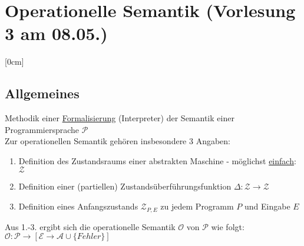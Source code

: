 \section{Operationelle Semantik \tiny (Vorlesung 3 am 08.05.)}
[0cm]
\subsection{Allgemeines}
Methodik einer \underline{Formalisierung} (Interpreter) der Semantik einer Programmiersprache $\mathcal{P}$\\
Zur operationellen Semantik gehören insbesondere 3 Angaben:
\begin{enumerate}
	\item Definition des Zustandsraums einer abstrakten Maschine - möglichst \underline{einfach}: $\mathcal{Z}$
	\item Definition einer (partiellen) Zustandsüberführungsfunktion $\Delta:\mathcal{Z}\rightarrow \mathcal{Z}$
	\item Definition eines Anfangszustands $\mathcal{Z}_{P,E}$ zu jedem Programm $P$ und Eingabe $E$
\end{enumerate}
Aus 1.-3. ergibt sich die operationelle Semantik $\mathcal{O}$  von $\mathcal{P}$ wie folgt:\\
$\mathcal{O}:\mathcal{P}\rightarrow[\mathcal{E}\rightarrow \mathcal{A}\cup \{Fehler\}]$\\

